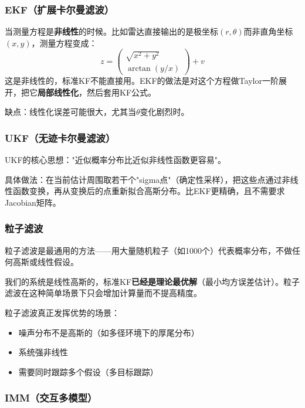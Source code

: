\documentclass[12pt, a4paper]{article}
\begin{document}
\subsubsection{EKF（扩展卡尔曼滤波）}

\begin{intubox}[什么时候需要EKF？]
当测量方程是\textbf{非线性}的时候。比如雷达直接输出的是极坐标$(r, \theta)$而非直角坐标$(x, y)$，测量方程变成：
\[
z = \begin{pmatrix} \sqrt{x^2+y^2} \\ \arctan(y/x) \end{pmatrix} + v
\]
这是非线性的，标准KF不能直接用。EKF的做法是对这个方程做Taylor一阶展开，把它\textbf{局部线性化}，然后套用KF公式。

缺点：线性化误差可能很大，尤其当$\theta$变化剧烈时。
\end{intubox}

\subsubsection{UKF（无迹卡尔曼滤波）}

UKF的核心思想："近似概率分布比近似非线性函数更容易"。

具体做法：在当前估计周围取若干个"sigma点"（确定性采样），把这些点通过非线性函数变换，再从变换后的点重新拟合高斯分布。比EKF更精确，且不需要求Jacobian矩阵。

\subsubsection{粒子滤波}

粒子滤波是最通用的方法——用大量随机粒子（如1000个）代表概率分布，不做任何高斯或线性假设。

\begin{warnbox}
我们的系统是线性高斯的，标准KF\textbf{已经是理论最优解}（最小均方误差估计）。粒子滤波在这种简单场景下只会增加计算量而不提高精度。

粒子滤波真正发挥优势的场景：
\begin{itemize}
  \item 噪声分布不是高斯的（如多径环境下的厚尾分布）
  \item 系统强非线性
  \item 需要同时跟踪多个假设（多目标跟踪）
\end{itemize}
\end{warnbox}

\subsubsection{IMM（交互多模型）}
\end{document}
